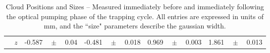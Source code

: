 \begin{table}[h!!!!t]
\begin{center}
\begin{tabular}{ c | r || lcl | lcl || lcl | lcl |}
								& $z$ & -0.587    & \!\!$\!\! \pm  \!\!$\!\! & 0.04   & -0.481  & \!\!$\!\! \pm  \!\!$\!\! & 0.018 & 0.969 & \!\!$\!\! \pm  \!\!$\!\! & 0.003 & 1.861 & \!\!$\!\! \pm  \!\!$\!\! & 0.013 \\
			\cline{2-14}
	\end{tabular}
	\end{center}
	\caption[Cloud Position and Size]{Cloud Positions and Sizes -- Measured immediately before and immediately following the optical pumping phase of the trapping cycle.  All entries are expressed in units of mm, and the ``size" parameters describe the gaussian width.}
	\label{table:cloudpositions}
\end{table}

